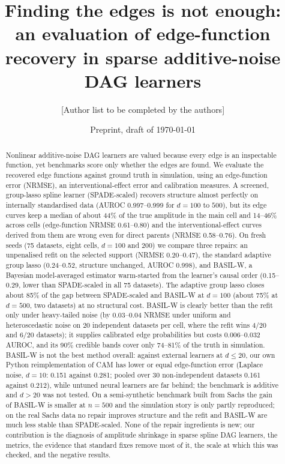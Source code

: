\documentclass[11pt,a4paper]{article}
\title{Finding the edges is not enough: an evaluation of edge-function recovery in sparse additive-noise DAG learners}
\author{[Author list to be completed by the authors]}
\date{Preprint, draft of \today}
\begin{document}
\maketitle

\begin{abstract}
Nonlinear additive-noise DAG learners are valued because every edge is an inspectable function, yet benchmarks score only whether the edges are found. We evaluate the recovered edge functions against ground truth in simulation, using an edge-function error (NRMSE), an interventional-effect error and calibration measures. A screened, group-lasso spline learner (SPADE-scaled) recovers structure almost perfectly on internally standardised data (AUROC 0.997--0.999 for $d=100$ to $500$), but its edge curves keep a median of about 44\% of the true amplitude in the main cell and 14--46\% across cells (edge-function NRMSE 0.61--0.80) and the interventional-effect curves derived from them are wrong even for direct parents (NRMSE 0.58--0.76). On fresh seeds (75 datasets, eight cells, $d=100$ and $200$) we compare three repairs: an unpenalised refit on the selected support (NRMSE 0.20--0.47), the standard adaptive group lasso (0.24--0.52, structure unchanged, AUROC 0.998), and BASIL-W, a Bayesian model-averaged estimator warm-started from the learner's causal order (0.15--0.29, lower than SPADE-scaled in all 75 datasets). The adaptive group lasso closes about 85\% of the gap between SPADE-scaled and BASIL-W at $d=100$ (about 75\% at $d=500$, two datasets) at no structural cost. BASIL-W is clearly better than the refit only under heavy-tailed noise (by 0.03--0.04 NRMSE under uniform and heteroscedastic noise on 20 independent datasets per cell, where the refit wins 4/20 and 6/20 datasets); it supplies calibrated edge probabilities but costs 0.006--0.032 AUROC, and its 90\% credible bands cover only 74--81\% of the truth in simulation. BASIL-W is not the best method overall: against external learners at $d\le20$, our own Python reimplementation of CAM has lower or equal edge-function error (Laplace noise, $d=10$: 0.151 against 0.281; pooled over 30 non-independent datasets 0.161 against 0.212), while untuned neural learners are far behind; the benchmark is additive and $d>20$ was not tested. On a semi-synthetic benchmark built from Sachs the gain of BASIL-W is smaller at $n=500$ and the simulation story is only partly reproduced; on the real Sachs data no repair improves structure and the refit and BASIL-W are much less stable than SPADE-scaled. None of the repair ingredients is new; our contribution is the diagnosis of amplitude shrinkage in sparse spline DAG learners, the metrics, the evidence that standard fixes remove most of it, the scale at which this was checked, and the negative results.
\end{abstract}
\end{document}
